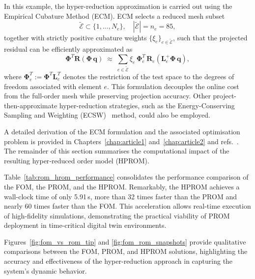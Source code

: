 In this example, the hyper-reduction approximation is carried out using the Empirical Cubature Method (ECM). ECM selects a reduced mesh subset
\[
\widetilde{\mathcal{E}} \subset \{1,\dots,N_e\}, 
\quad |\widetilde{\mathcal{E}}| = n_e = 85,
\]
together with strictly positive cubature weights \( \{ \xi_{e} \}_{e \in \widetilde{\mathcal{E}}} \), such that the projected residual can be efficiently approximated as
\begin{equation}
\boldsymbol{\Phi}^{\!T}\mathbf{R}(\boldsymbol{\Phi}\,\mathbf{q})
\;\approx\;
\sum_{e \in \widetilde{\mathcal{E}}} \xi_{e} \,
\boldsymbol{\Phi}_{e}^{\!T} \, \mathbf{R}_{e}(\mathbf{L}_{e}^{+} \boldsymbol{\Phi}\,\mathbf{q}),
\end{equation}
where \( \boldsymbol{\Phi}_{e}^{\!T} := \boldsymbol{\Phi}^{\!T} \mathbf{L}_{e}^{\!T} \) denotes the restriction of the test space to the degrees of freedom associated with element \(e\).  
This formulation decouples the online cost from the full-order mesh while preserving projection accuracy.  
Other project-then-approximate hyper-reduction strategies, such as the Energy-Conserving Sampling and Weighting (ECSW)~\cite{Farhat2015} method, could also be employed.


A detailed derivation of the ECM formulation and the associated optimisation problem is provided in Chapters~\ref{chap:article1} and~\ref{chap:article2} and refs.~\cite{hernandez2017dimensional,hernandez2020multiscale}.  The remainder of this section summarises the computational impact of the resulting hyper‑reduced order model (HPROM).


Table~\ref{tab:rom_hrom_performance} consolidates the performance comparison of the FOM, the PROM, and the HPROM. Remarkably, the HPROM achieves a wall-clock time of only 5.91\,s, more than 32 times faster than the PROM and nearly 60 times faster than the FOM. This acceleration allows real-time execution of high-fidelity simulations, demonstrating the practical viability of PROM deployment in time-critical digital twin environments.

Figures~\ref{fig:fom_vs_rom_tip} and \ref{fig:fom_rom_snapshots} provide qualitative comparisons between the FOM, PROM, and HPROM solutions, highlighting the accuracy and effectiveness of the hyper-reduction approach in capturing the system's dynamic behavior.



